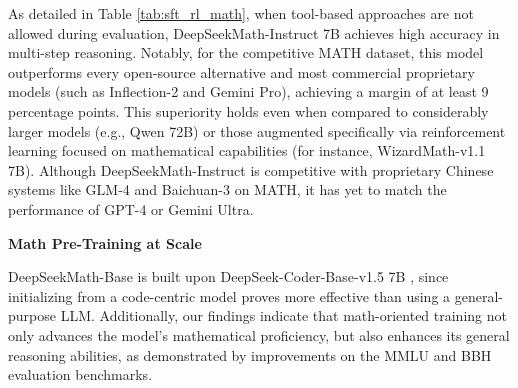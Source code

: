 As detailed in Table \ref{tab:sft_rl_math}, when tool-based approaches are not allowed during evaluation, DeepSeekMath-Instruct 7B achieves high accuracy in multi-step reasoning. Notably, for the competitive MATH dataset, this model outperforms every open-source alternative and most commercial proprietary models (such as Inflection-2 and Gemini Pro), achieving a margin of at least 9 percentage points. This superiority holds even when compared to considerably larger models (e.g., Qwen 72B) or those augmented specifically via reinforcement learning focused on mathematical capabilities (for instance, WizardMath-v1.1 7B). Although DeepSeekMath-Instruct is competitive with proprietary Chinese systems like GLM-4 and Baichuan-3 on MATH, it has yet to match the performance of GPT-4 or Gemini Ultra.

\textbf{Math Pre-Training at Scale}

DeepSeekMath-Base is built upon DeepSeek-Coder-Base-v1.5 7B \citep{deepseek-coder}, since initializing from a code-centric model proves more effective than using a general-purpose LLM. Additionally, our findings indicate that math-oriented training not only advances the model's mathematical proficiency, but also enhances its general reasoning abilities, as demonstrated by improvements on the MMLU \citep{mmlu} and BBH \citep{bbh} evaluation benchmarks.

